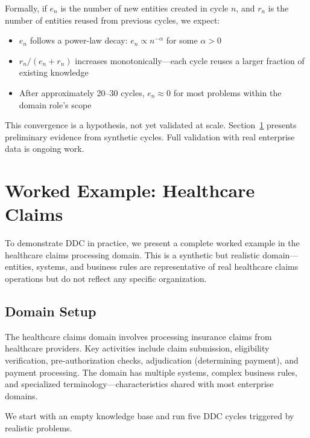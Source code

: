 \documentclass[11pt,a4paper]{article}
\begin{document}
Formally, if $e_n$ is the number of new entities created in cycle $n$, and $r_n$ is the number of entities reused from previous cycles, we expect:

\begin{itemize}
  \item $e_n$ follows a power-law decay: $e_n \propto n^{-\alpha}$ for some $\alpha > 0$
  \item $r_n / (e_n + r_n)$ increases monotonically---each cycle reuses a larger fraction of existing knowledge
  \item After approximately 20--30 cycles, $e_n \approx 0$ for most problems within the domain role's scope
\end{itemize}

This convergence is a hypothesis, not yet validated at scale. Section~\ref{sec:example} presents preliminary evidence from synthetic cycles. Full validation with real enterprise data is ongoing work.

\section{Worked Example: Healthcare Claims}
\label{sec:example}

To demonstrate DDC in practice, we present a complete worked example in the healthcare claims processing domain. This is a synthetic but realistic domain---entities, systems, and business rules are representative of real healthcare claims operations but do not reflect any specific organization.

\subsection{Domain Setup}

The healthcare claims domain involves processing insurance claims from healthcare providers. Key activities include claim submission, eligibility verification, pre-authorization checks, adjudication (determining payment), and payment processing. The domain has multiple systems, complex business rules, and specialized terminology---characteristics shared with most enterprise domains.

We start with an empty knowledge base and run five DDC cycles triggered by realistic problems.
\end{document}
